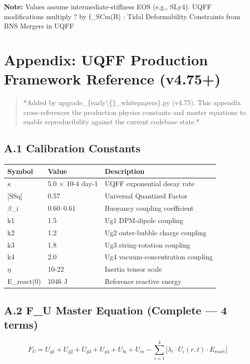 \documentclass[11pt]{article}
\begin{document}
\textbf{Note:} Values assume intermediate-stiffness EOS (e.g., SLy4). UQFF modifications multiply ? by f\_SCm(B) : Tidal Deformability Constraints from BNS Mergers in UQFF

\section*{Appendix: UQFF Production Framework Reference (v4.75+)}

\begin{quote}
*Added by upgrade\_\{early\textbackslash\{\}\_whitepapers\}.py (v4.75). This appendix cross-references
the production physics constants and master equations to enable reproducibility
against the current codebase state.*
\end{quote}

\subsection*{A.1 Calibration Constants}

\begin{center}
\begin{longtable}{lll}
\toprule
Symbol & Value & Description \tabularnewline
\midrule
\endhead
$\kappa$ & 5.0 $\times$ 10-4 day-1 & UQFF exponential decay rate \tabularnewline
{}[SSq] & 0.57 & Universal Quantized Factor \tabularnewline
$\beta$\_i & 0.60--0.61 & Buoyancy coupling coefficient \tabularnewline
k1 & 1.5 & Ug1 DPM-dipole coupling \tabularnewline
k2 & 1.2 & Ug2 outer-bubble charge coupling \tabularnewline
k3 & 1.8 & Ug3 string-rotation coupling \tabularnewline
k4 & 2.0 & Ug4 vacuum-concentration coupling \tabularnewline
$\eta$ & 10-22 & Inertia tensor scale \tabularnewline
E\_react(0) & 1046 J & Reference reactive energy \tabularnewline
\bottomrule
\end{longtable}
\end{center}

\subsection*{A.2 F\_U Master Equation (Complete --- 4 terms)}

$$F_U = U_{g1} + U_{g2} + U_{g3} + U_{g4} + U_{bi} + U_m - \sum_{i=1}^{4}\bigl[\lambda_i \cdot U_i(r,t) \cdot E_{\mathrm{react}}\bigr]$$
\end{document}
